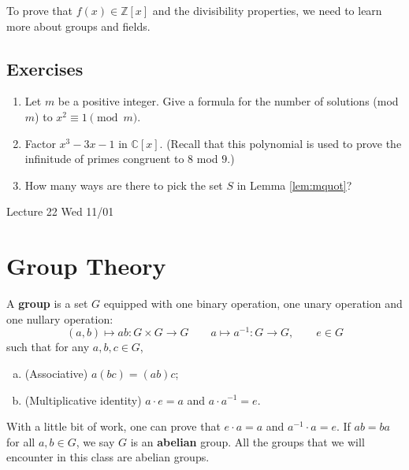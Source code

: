 \documentclass{article}
\def\Z{{\mathbb Z}}
\def\Z{{\mathbb Z}}
\def\C{{\mathbb C}}
\newcommand{\add}[1]{{\color{blue} #1}}
\begin{document}
To prove that $f(x)\in\Z[x]$ and the divisibility properties, we need to learn more about groups and fields.

\subsection*{Exercises}
\begin{enumerate}[\thesection .1]
    \item Let $m$ be a positive integer. Give a formula for the number of solutions (mod $m$) to $x^2\equiv 1\pmod{m}$.
    \item Factor $x^3 - 3x - 1$ in $\C[x]$. (Recall that this polynomial is used to prove the infinitude of primes congruent to $8$ mod $9$.)
    \item How many ways are there to pick the set $S$ in Lemma \ref{lem:mquot}?
\end{enumerate}

\begin{center}
    \add{Lecture 22 Wed 11/01}
\end{center}

\section{Group Theory}

A \textbf{group} is a set $G$ equipped with one binary operation, one unary operation and one nullary operation:
$$(a,b)\mapsto ab:G\times G\rightarrow G\qquad a\mapsto a^{-1}:G\rightarrow G, \qquad e\in G$$
such that for any $a,b,c\in G$,
\begin{enumerate}[(a)]
    \item (Associative) $a(bc) = (ab)c$;
    \item (Multiplicative identity) $a\cdot e = a$ and $a\cdot a^{-1} = e$.
\end{enumerate}
With a little bit of work, one can prove that $e\cdot a = a$ and $a^{-1}\cdot a = e$. If $ab = ba$ for all $a,b\in G$, we say $G$ is an \textbf{abelian} group. All the groups that we will encounter in this class are abelian groups.
\end{document}
